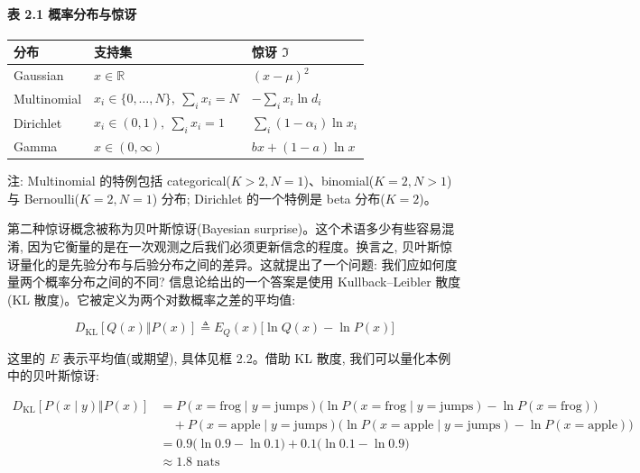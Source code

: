 \paragraph{表 2.1 概率分布与惊讶}

\begin{center}
\begin{tabular}{lll}
\hline
分布 & 支持集 & 惊讶 $\Im$ \\
\hline
Gaussian & $x \in \mathbb{R}$ & $(x-\mu)^2$ \\
Multinomial & $x_i \in \{0,\ldots,N\},\ \sum_i x_i = N$ & $-\sum_i x_i \ln d_i$ \\
Dirichlet & $x_i \in (0,1),\ \sum_i x_i = 1$ & $\sum_i (1-\alpha_i)\ln x_i$ \\
Gamma & $x \in (0,\infty)$ & $bx + (1-a)\ln x$ \\
\hline
\end{tabular}
\end{center}

注: Multinomial 的特例包括 categorical($K>2, N=1$)、binomial($K=2, N>1$) 与 Bernoulli($K=2, N=1$) 分布; Dirichlet 的一个特例是 beta 分布($K=2$)。

第二种惊讶概念被称为贝叶斯惊讶(Bayesian surprise)。这个术语多少有些容易混淆, 因为它衡量的是在一次观测之后我们必须更新信念的程度。换言之, 贝叶斯惊讶量化的是先验分布与后验分布之间的差异。这就提出了一个问题: 我们应如何度量两个概率分布之间的不同? 信息论给出的一个答案是使用 Kullback--Leibler 散度(KL 散度)。它被定义为两个对数概率之差的平均值:

\begin{equation}
D_{\mathrm{KL}}[Q(x)\Vert P(x)] \triangleq E_Q(x)\bigl[\ln Q(x) - \ln P(x)\bigr]
\tag{2.3}
\end{equation}

这里的 $E$ 表示平均值(或期望), 具体见框 2.2。借助 KL 散度, 我们可以量化本例中的贝叶斯惊讶:

\begin{equation}
\begin{aligned}
D_{\mathrm{KL}}[P(x \mid y)\Vert P(x)]
&= P(x = \text{frog} \mid y = \text{jumps}) \bigl(\ln P(x = \text{frog} \mid y = \text{jumps}) - \ln P(x = \text{frog})\bigr) \\
&\quad + P(x = \text{apple} \mid y = \text{jumps}) \bigl(\ln P(x = \text{apple} \mid y = \text{jumps}) - \ln P(x = \text{apple})\bigr) \\
&= 0.9\bigl(\ln 0.9 - \ln 0.1\bigr) + 0.1\bigl(\ln 0.1 - \ln 0.9\bigr) \\
&\approx 1.8 \text{ nats}
\end{aligned}
\tag{2.4}
\end{equation}

